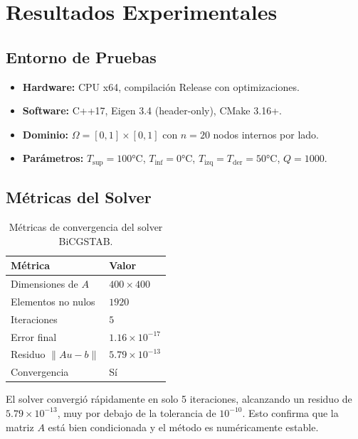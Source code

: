 \documentclass[12pt,a4paper]{article}
\theoremstyle{definition}
\newcommand{\norm}[1]{\|#1\|}
\begin{document}
\section{Resultados Experimentales}\label{sec:resultados}

\subsection{Entorno de Pruebas}

\begin{itemize}
    \item \textbf{Hardware:} CPU x64, compilaci\'{o}n Release con optimizaciones.
    \item \textbf{Software:} C++17, Eigen 3.4 (header-only), CMake 3.16+.
    \item \textbf{Dominio:} $\Omega = [0,1] \times [0,1]$ con $n = 20$ nodos internos por lado.
    \item \textbf{Par\'{a}metros:} $T_{\text{sup}} = 100\text{°C}$, $T_{\text{inf}} = 0\text{°C}$, $T_{\text{izq}} = T_{\text{der}} = 50\text{°C}$, $Q = 1000$.
\end{itemize}

\subsection{M\'{e}tricas del Solver}

\begin{table}[H]
\centering
\caption{M\'{e}tricas de convergencia del solver BiCGSTAB.}
\label{tab:convergencia}
\begin{tabular}{@{}ll@{}}
\toprule
\textbf{M\'{e}trica} & \textbf{Valor} \\ \midrule
Dimensiones de $A$ & $400 \times 400$ \\
Elementos no nulos & $1920$ \\
Iteraciones & $5$ \\
Error final & $1.16 \times 10^{-17}$ \\
Residuo $\norm{Au - b}$ & $5.79 \times 10^{-13}$ \\
Convergencia & S\'{i} \\ \bottomrule
\end{tabular}
\end{table}

El solver convergi\'{o} r\'{a}pidamente en solo 5 iteraciones, alcanzando un residuo de $5.79 \times 10^{-13}$, muy por debajo de la tolerancia de $10^{-10}$. Esto confirma que la matriz $A$ est\'{a} bien condicionada y el m\'{e}todo es num\'{e}ricamente estable.
\end{document}
